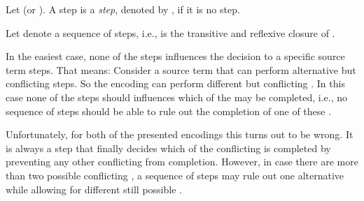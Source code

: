 \documentclass[]{llncs}
\begin{document}
\begin{definition} \label{def:adminStep}
	Let  (or ). A step  is a \emph{\admin step}, denoted by , if it is no \nonAdmin step.
	
	Let  denote a sequence of \admin steps, i.e.,  is the transitive and reflexive closure of .
\end{definition}

In the easiest case, none of the \admin steps influences the decision to \simulate a specific source term steps. That means: Consider a source term that can perform alternative but conflicting steps. So the encoding can perform different but conflicting \simulations. In this case none of the \admin steps should influences which of the \simulations may be completed, i.e., no sequence of \admin steps should be able to rule out the completion of one of these \simulations.

Unfortunately, for both of the presented encodings this turns out to be wrong. It is always a \nonAdmin step that finally decides which of the conflicting \simulations is completed by preventing any other conflicting \simulation from completion. However, in case there are more than two possible conflicting \simulations, a sequence of \admin steps may rule out one alternative while allowing for different still possible \simulations.
\end{document}
